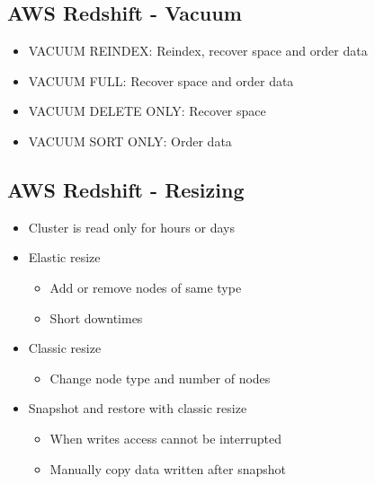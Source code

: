 \documentclass[../main.tex]{subfiles}
\begin{document}
\subsection{AWS Redshift - Vacuum}
\begin{itemize}
    \item VACUUM REINDEX: Reindex, recover space and order data
    \item VACUUM FULL: Recover space and order data
    \item VACUUM DELETE ONLY: Recover space
    \item VACUUM SORT ONLY: Order data
\end{itemize}

\subsection{AWS Redshift - Resizing}
\begin{itemize}
    \item Cluster is read only for hours or days
    \item Elastic resize
    \begin{itemize}
        \item Add or remove nodes of same type
        \item Short downtimes
    \end{itemize}
    \item Classic resize
    \begin{itemize}
        \item Change node type and number of nodes
    \end{itemize}
    \item Snapshot and restore with classic resize
    \begin{itemize}
        \item When writes access cannot be interrupted
        \item Manually copy data written after snapshot
    \end{itemize}
\end{itemize}
\end{document}
